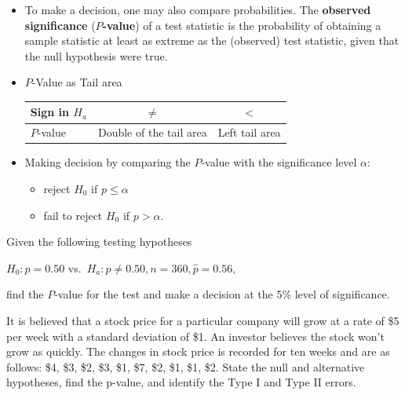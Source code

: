 \begin{itemize}
\item
  To make a decision, one may also compare probabilities. The
  \textbf{observed significance} (\textbf{$P$-value}) of a test statistic is the probability of obtaining a sample statistic at least as extreme as the (observed) test statistic, given that the null hypothesis were true.
\item
  \(P\)-Value as Tail area

  \begin{longtable}[]{@{}lcc@{}}
  \toprule()
  Sign in \(H_a\) & \(\ne\) & \(<\) \\
  \midrule()
  \endhead
  \(P\)-value & Double of the tail area & Left tail area \\
  \bottomrule()
  \end{longtable}
\item
  Making decision by comparing the \(P\)-value with the significance
  level \(\alpha\):

  \begin{itemize}
  \item
    reject \(H_0\) if \(p\le \alpha\)
  \item
    fail to reject \(H_0\) if \(p>\alpha\).
  \end{itemize}
\end{itemize}

\begin{example}

Given the following testing hypotheses

\(H_{0}: p=0.50\) vs.~\(H_{a}: p\ne 0.50, n=360, \hat{p}=0.56\),

find the \(P\)-value for the test and make a decision at the 5\% level
of significance.

\end{example}
\vspace*{6\baselineskip}

\begin{example}

It is believed that a stock price for a particular company will grow at
a rate of \$5 per week with a standard deviation of \$1. An investor
believes the stock won't grow as quickly. The changes in stock price is
recorded for ten weeks and are as follows: \$4, \$3, \$2, \$3, \$1, \$7,
\$2, \$1, \$1, \$2. State the null and alternative hypotheses, find the
p-value, and identify the Type I and Type II errors.

\end{example}
\vspace*{6\baselineskip}

